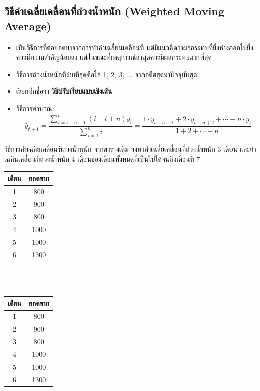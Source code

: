 \subsection{วิธีค่าเฉลี่ยเคลื่อนที่ถ่วงน้ำหนัก (Weighted Moving Average)}
\begin{itemize}
    \item เป็นวิธีการที่ต่อยอดมาจากการทำค่าเฉลี่ยนเคลื่อนที่ แต่มีแนวคิดว่าผลกระทบที่ยิ่งห่างออกไปยิ่งควรมีความสำคัญน้อยลง แต่ในขณะที่เหตุการณ์ล่าสุดควรมีผลกระทบมากที่สุด
    \item วิธีการถ่วงน้ำหนักที่ง่ายที่สุดคือไล่ 1, 2, 3, ... จากอดีตสุดมาปัจจุบันสุด
    \item เรียกอีกชื่อว่า \textbf{วิธีปรับเรียบแบบเชิงเส้น}
    \item วิธีการคำนวณ:
    \[
    \hat{y}_{t+1} = \frac{\sum_{i=t-n+1}^{t} (i-t+n)y_i}{\sum_{i=1}^n i} = \frac{1 \cdot y_{t-n+1} + 2 \cdot y_{t-n+2} + \cdots + n \cdot y_t}{1 + 2 + \cdots + n}
    \]
\end{itemize}
\begin{example}
    {วิธีการค่าเฉลี่ยเคลื่อนที่ถ่วงน้ำหนัก}{}
    จากตารางเดิม จงหาค่าเฉลี่ยเคลื่อนที่ถ่วงน้ำหนัก 3 เดือน และค่าเฉลี่นเคลื่อนที่ถ่วงน้ำหนัก 4 เดือนของเดือนทั้งหมดที่เป็นไปได้จนถึงเดือนที่ 7
\end{example}
\begin{tabular}{|c|c|}
\hline
เดือน & ยอดขาย \\ \hline
1     & 800    \\ \hline
2     & 900    \\ \hline
3     & 800    \\ \hline
4     & 1000   \\ \hline
5     & 1000   \\ \hline
6     & 1300   \\ \hline
\end{tabular}\\
~
\vspace{1cm}\\
\noindent\begin{tabular}{|c|c|}
\hline
เดือน & ยอดขาย \\ \hline
1     & 800    \\ \hline
2     & 900    \\ \hline
3     & 800    \\ \hline
4     & 1000   \\ \hline
5     & 1000   \\ \hline
6     & 1300   \\ \hline
\end{tabular}

